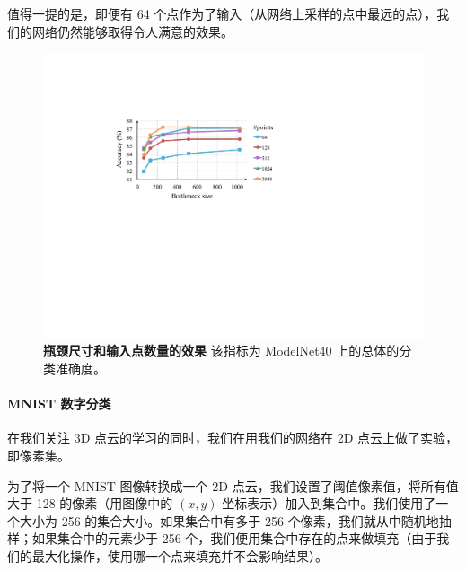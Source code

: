 值得一提的是，即便有 64 个点作为了输入（从网络上采样的点中最远的点），我们的网络仍然能够取得令人满意的效果。


\begin{figure}[h]
    \centering
    \includegraphics[width=0.8\linewidth]{fig/bottleneck.pdf}
    \caption{\textbf{瓶颈尺寸和输入点数量的效果} 该指标为 ModelNet40 上的总体的分类准确度。}
    \label{fig:net_param}
\end{figure}

\paragraph{MNIST 数字分类} 在我们关注 3D 点云的学习的同时，我们在用我们的网络在 2D 点云上做了实验，即像素集。


为了将一个 MNIST 图像转换成一个 2D 点云，我们设置了阈值像素值，将所有值大于 128 的像素（用图像中的 $(x,y)$ 坐标表示）加入到集合中。我们使用了一个大小为 256 的集合大小。如果集合中有多于 256 个像素，我们就从中随机地抽样；如果集合中的元素少于 256 个，我们便用集合中存在的点来做填充（由于我们的最大化操作，使用哪一个点来填充并不会影响结果）。


